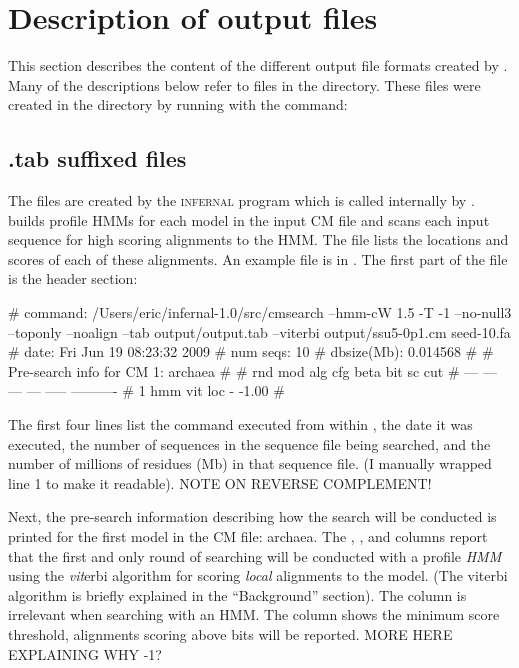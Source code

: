 \section{Description of output files}

This section describes the content of the different output file
formats created by . Many of the descriptions below
refer to files in the  directory. These files
were created in the  directory by running
 with the command: 


\subsection{.tab suffixed files}

The  files are created by the \textsc{infernal} program
 which is called internally by
.  builds profile HMMs for each model
in the input CM file and scans each input sequence for high scoring
alignments to the HMM. The  file lists the locations and
scores of each of these alignments. An example  file is in 
. The first part of the file is the
header section:

\begin{sreoutput}
# command:    /Users/eric/infernal-1.0/src/cmsearch --hmm-cW 1.5 -T -1 --no-null3 \\
--toponly --noalign --tab output/output.tab --viterbi output/ssu5-0p1.cm seed-10.fa
# date:       Fri Jun 19 08:23:32 2009
# num seqs:   10
# dbsize(Mb): 0.014568
#
# Pre-search info for CM 1: archaea
#
# rnd  mod  alg  cfg   beta  bit sc cut
# ---  ---  ---  ---  -----  ----------
#   1  hmm  vit  loc      -       -1.00
#
\end{sreoutput}

The first four lines list the  command executed from
within , the date it was executed, the number of
sequences in the sequence file being searched, and the number of
millions of residues (Mb) in that sequence file. (I manually
wrapped line 1 to make it readable). NOTE ON REVERSE COMPLEMENT!

Next, the pre-search information describing how the search will be
conducted is printed for the first model in the CM file: archaea. 
The , ,  and  columns report
that the first and only round of searching will be conducted with a
profile \emph{HMM} using the \emph{vit}erbi algorithm for scoring
\emph{local} alignments to the model. (The viterbi algorithm is
briefly explained in the ``Background'' section). The 
column is irrelevant when searching with an HMM. The 
column shows the minimum score threshold, alignments scoring above
 bits will be reported. MORE HERE EXPLAINING WHY -1?


